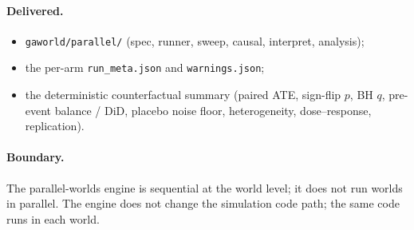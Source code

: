 \paragraph{Delivered.}
\begin{itemize}[leftmargin=*]
  \item \texttt{gaworld/parallel/} (spec, runner, sweep, causal,
  interpret, analysis);
  \item the per-arm \texttt{run\_meta.json} and \texttt{warnings.json};
  \item the deterministic counterfactual summary (paired ATE, sign-flip
  $p$, BH $q$, pre-event balance / DiD, placebo noise floor,
  heterogeneity, dose--response, replication).
\end{itemize}

\paragraph{Boundary.}
The parallel-worlds engine is sequential at the world level; it does
not run worlds in parallel.  The engine does not change the simulation
code path; the same code runs in each world.
